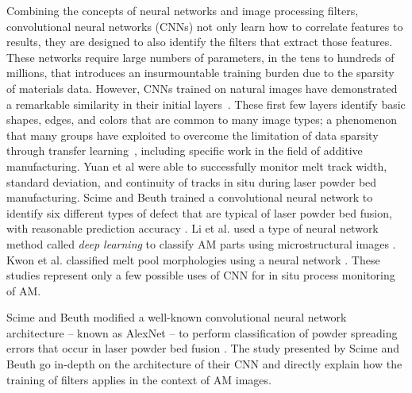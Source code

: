 Combining the concepts of neural networks and image processing filters, convolutional neural networks (CNNs) not only learn how to correlate features to results, they are designed to also identify the filters that extract those features. These networks require large numbers of parameters, in the tens to hundreds of millions, that introduces an insurmountable training burden due to the sparsity of materials data. However, CNNs trained on natural images have demonstrated a remarkable similarity in their initial layers~\cite{Yosinski2014}. These first few layers identify basic shapes, edges, and colors that are common to many image types; a phenomenon that many groups have exploited to overcome the limitation of data sparsity through transfer learning~\cite{Ling2017a}, including specific work in the field of additive manufacturing. Yuan et al \cite{Yuan2018} were able to successfully monitor melt track width, standard deviation, and continuity of tracks in situ during laser powder bed manufacturing. Scime and Beuth trained a convolutional neural network to identify six different types of defect that are typical of laser powder bed fusion, with reasonable prediction accuracy \cite{Scime2018}. Li et al. used a type of neural network method called \textit{deep learning} to classify AM parts using microstructural images \cite{Li2020}. Kwon et al. classified melt pool morphologies using a neural network \cite{Kwon2018}. These studies represent only a few possible uses of CNN for in situ process monitoring of AM.

Scime and Beuth modified a well-known convolutional neural network architecture -- known as AlexNet \cite{Krizhevsky2012} -- to perform classification of powder spreading errors that occur in laser powder bed fusion \cite{Scime2019}. The study presented by Scime and Beuth go in-depth on the architecture of their CNN and directly explain how the training of filters applies in the context of AM images. 
